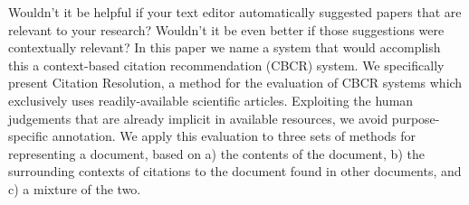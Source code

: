 Wouldn't it be helpful if your text editor automatically suggested papers that are relevant to your research? Wouldn't it be even better if those suggestions were contextually relevant? In this paper we name a system that would accomplish this a context-based citation recommendation (CBCR) system. We specifically present Citation Resolution, a method for the evaluation of CBCR systems which exclusively uses readily-available scientific articles. Exploiting the human judgements that are already implicit in available resources, we avoid purpose-specific annotation. We apply this evaluation to three sets of methods for representing a document, based on a) the contents of the document, b) the surrounding contexts of citations to the document found in other documents, and c) a mixture of the two.
